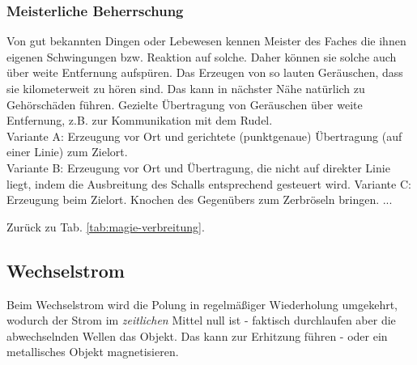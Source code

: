 \subsubsection{Meisterliche Beherrschung} 
\begin{outline}
	\1 Von gut bekannten Dingen oder Lebewesen kennen Meister des Faches die ihnen eigenen Schwingungen bzw. Reaktion auf solche. 
	Daher können sie solche auch über weite Entfernung aufspüren.
	\1 Das Erzeugen von so lauten Geräuschen, dass sie kilometerweit zu hören sind. 
	Das kann in nächster Nähe natürlich zu Gehörschäden führen.
	\1 Gezielte Übertragung von Geräuschen über weite Entfernung, z.B. zur Kommunikation mit dem Rudel. \\ 
	Variante A: Erzeugung vor Ort und gerichtete (punktgenaue) Übertragung (auf einer Linie) zum Zielort. \\
	Variante B: Erzeugung vor Ort und Übertragung, die nicht auf direkter Linie liegt, indem die Ausbreitung des Schalls entsprechend gesteuert wird.
	Variante C: Erzeugung beim Zielort.
	\1 Knochen des Gegenübers zum Zerbröseln bringen.
	\1 ...
\end{outline}
Zurück zu Tab. \ref{tab:magie-verbreitung}.



\subsection{Wechselstrom}\label{magie:wechselstrom}
Beim Wechselstrom wird die Polung in regelmäßiger Wiederholung umgekehrt, wodurch der Strom im \textit{zeitlichen} Mittel null ist - faktisch durchlaufen aber die abwechselnden Wellen das Objekt.
Das kann zur Erhitzung führen - oder ein metallisches Objekt magnetisieren.

